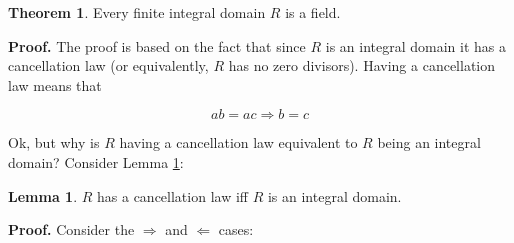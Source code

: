 \documentclass{article}
\theoremstyle{definition}
\newtheorem{theorem}{Theorem}[section]
\newtheorem{lemma}{Lemma}[section]
\begin{document}
\bigskip
\begin{theorem}
Every finite integral domain $R$ is a field.
\label{theorem:finite_id_is_a_field}
\end{theorem}

\noindent
\textbf{Proof.}  The proof is based on the fact that since $R$ is
an integral domain it has a cancellation law (or equivalently,
$R$ has no zero divisors).  Having a cancellation law means that

\smallskip
\begin{equation}
ab = ac \Rightarrow b = c
\label{eqn:cancellation_law}
\end{equation}

\medskip
\noindent
Ok, but why is $R$ having a cancellation law equivalent to $R$ 
being an integral domain? Consider Lemma \ref{lemma:zero_divisors}:

\bigskip
\begin{lemma}
$R$ has a cancellation law iff $R$ is an integral domain.
\label{lemma:zero_divisors}
\end{lemma}


\noindent
\textbf{Proof.} Consider the $\Rightarrow$ and $\Leftarrow$ cases:
\end{document}
